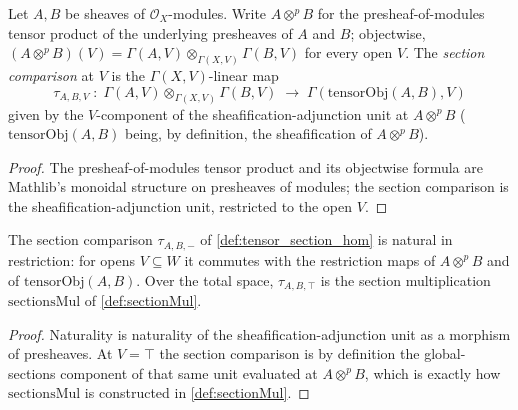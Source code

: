 \begin{definition}\leanok
  \label{def:tensor_section_hom}
  Let \(A, B\) be sheaves of \(\mathcal O_X\)-modules. Write \(A \otimes^p B\)
  for the presheaf-of-modules tensor product of the underlying presheaves of
  \(A\) and \(B\); objectwise, \((A \otimes^p B)(V) = \Gamma(A,V)
  \otimes_{\Gamma(X,V)} \Gamma(B,V)\) for every open \(V\). The
  \emph{section comparison} at \(V\) is the \(\Gamma(X,V)\)-linear map
  \[
    \tau_{A,B,V} \;:\; \Gamma(A,V) \otimes_{\Gamma(X,V)} \Gamma(B,V)
    \;\longrightarrow\; \Gamma(\mathrm{tensorObj}(A,B), V)
  \]
  given by the \(V\)-component of the sheafification-adjunction unit at
  \(A \otimes^p B\) (\(\mathrm{tensorObj}(A,B)\) being, by definition, the
  sheafification of \(A \otimes^p B\)).
\end{definition}
\begin{proof}\leanok
  The presheaf-of-modules tensor product and its objectwise formula are
  Mathlib's monoidal structure on presheaves of modules; the section
  comparison is the sheafification-adjunction unit, restricted to the open
  \(V\).
\end{proof}

\begin{lemma}\leanok
  \label{lem:tensor_section_hom_naturality}
  The section comparison \(\tau_{A,B,-}\) of \cref{def:tensor_section_hom}
  is natural in restriction: for opens \(V \subseteq W\) it commutes with
  the restriction maps of \(A \otimes^p B\) and of \(\mathrm{tensorObj}(A,B)\).
  Over the total space, \(\tau_{A,B,\top}\) is the section multiplication
  \(\mathrm{sectionsMul}\) of \cref{def:sectionMul}.
\end{lemma}
\begin{proof}\leanok
  Naturality is naturality of the sheafification-adjunction unit as a
  morphism of presheaves. At \(V = \top\) the section comparison is by
  definition the global-sections component of that same unit evaluated at
  \(A \otimes^p B\), which is exactly how \(\mathrm{sectionsMul}\) is
  constructed in \cref{def:sectionMul}.
\end{proof}

